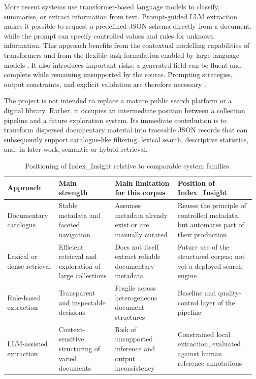 More recent systems use transformer-based language models to classify,
summarise, or extract information from text. Prompt-guided LLM extraction makes
it possible to request a predefined JSON schema directly from a document, while
the prompt can specify controlled values and rules for unknown information.
This approach benefits from the contextual modelling capabilities of
transformers \citep{vaswani2017attention,devlin2019bert} and from the flexible
task formulation enabled by large language models \citep{brown2020language}.
It also introduces important risks: a generated field can be fluent and
complete while remaining unsupported by the source. Prompting strategies,
output constraints, and explicit validation are therefore necessary
\citep{liu2023pre}.

The project is not intended to replace a mature public search platform or a
digital library. Rather, it occupies an intermediate position between a
collection pipeline and a future exploration system. Its immediate contribution
is to transform dispersed documentary material into traceable JSON records that
can subsequently support catalogue-like filtering, lexical search, descriptive
statistics, and, in later work, semantic or hybrid retrieval.

\begin{table}[H]
\centering
\begin{tabular}{p{3.2cm}p{3.5cm}p{3.5cm}p{3.4cm}}
\toprule
Approach & Main strength & Main limitation for this corpus & Position of Index\_Insight \\
\midrule
Documentary catalogue & Stable metadata and faceted navigation & Assumes metadata already exist or are manually curated & Reuses the principle of controlled metadata, but automates part of their production \\

Lexical or dense retrieval & Efficient retrieval and exploration of large collections & Does not itself extract reliable documentary metadata & Future use of the structured corpus; not yet a deployed search engine \\

Rule-based extraction & Transparent and inspectable decisions & Fragile across heterogeneous document structures & Baseline and quality-control layer of the pipeline \\

LLM-assisted extraction & Context-sensitive structuring of varied documents & Risk of unsupported inference and output inconsistency & Constrained local extraction, evaluated against human reference annotations \\
\bottomrule
\end{tabular}
\caption{Positioning of Index\_Insight relative to comparable system families.}
\label{tab:comparable-systems}
\end{table}

